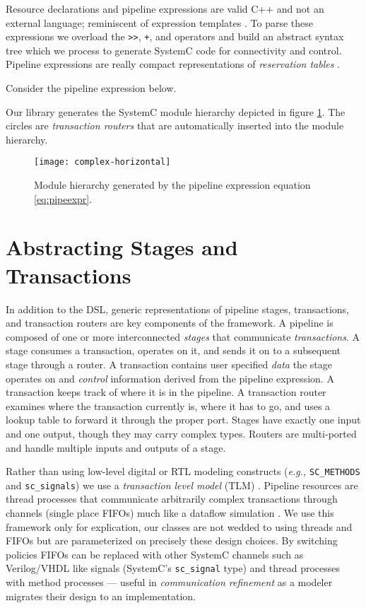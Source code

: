 \documentclass{entcs}
\begin{document}
Resource declarations and pipeline expressions are valid C++ and not an external language;
reminiscent of expression templates \cite{veldhuizen95}. To parse
these expressions we overload the {\tt >>}, {\tt +}, and {\tt *} operators and build
an abstract syntax tree which we process to generate SystemC code for
connectivity and control. Pipeline expressions are really compact representations
of {\em reservation tables} \cite{kogge81}.

Consider the pipeline expression below.

Our library generates the SystemC module hierarchy depicted in figure \ref{fig:complex}.
The circles are {\em transaction routers} that are automatically inserted into the module hierarchy.

\begin{figure}
  \texttt{[image: complex-horizontal]}
\caption{\label{fig:complex} Module hierarchy generated by the pipeline
         expression equation \ref{eq:pipeexpr}.}
\end{figure}

\section{\label{sec:stage}Abstracting Stages and Transactions}
In addition to the DSL, generic representations of pipeline stages, transactions,
and transaction routers are key
components of the framework. A pipeline is composed of one or more interconnected {\em stages}
that communicate {\em transactions}.
A stage consumes a transaction, operates on it, and sends it on to a subsequent stage
through a router.
A transaction contains user specified {\em data} the stage operates on and {\em control} information
derived from the pipeline expression.
A transaction keeps track of where it is in the pipeline. A transaction router
examines where the transaction currently is, where it has to go, and
uses a lookup table to forward it through the proper port.
Stages have exactly one input and one output, though they may carry complex types.
Routers are multi-ported and handle multiple inputs and outputs of a stage.

Rather than using low-level digital or RTL
modeling constructs ({\em e.g.,} {\tt SC\_METHODS} and {\tt sc\_signals})
we use a {\em transaction level model} (TLM) \cite{glms:systemc}. Pipeline resources are
thread processes that communicate arbitrarily complex transactions through channels
(single place FIFOs) much like
a dataflow simulation \cite{glms:systemc}. We use this framework only for explication,
our classes are not wedded to using threads and FIFOs but are
parameterized on precisely these design choices. By switching policies FIFOs can be
replaced with other SystemC channels
such as Verilog/VHDL like signals (SystemC's {\tt sc\_signal} type) and thread processes with
method processes --- useful in {\em communication refinement} as a modeler
migrates their design to an implementation.
\end{document}
